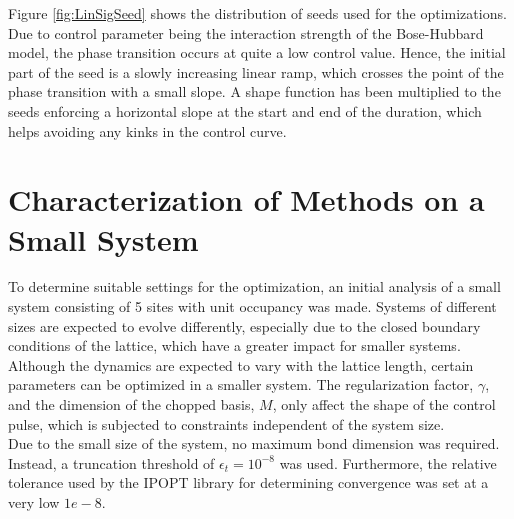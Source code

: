Figure \ref{fig:LinSigSeed} shows the distribution of seeds used for the optimizations. Due to control parameter being the interaction strength of the Bose-Hubbard model, the phase transition occurs at quite a low control value. Hence, the initial part of the seed is a slowly increasing linear ramp, which crosses the point of the phase transition with a small slope. A shape function has been multiplied to the seeds enforcing a horizontal slope at the start and end of the duration, which helps avoiding any kinks in the control curve.



\section{Characterization of Methods on a Small System} \label{sec:5partOptimization}
To determine suitable settings for the optimization, an initial analysis of a small system consisting of 5 sites with unit occupancy was made. Systems of different sizes are expected to evolve differently, especially due to the closed boundary conditions of the lattice, which have a greater impact for smaller systems. Although the dynamics are expected to vary with the lattice length, certain parameters can be optimized in a smaller system. The regularization factor, $\gamma$, and the dimension of the chopped basis, $M$, only affect the shape of the control pulse, which is subjected to constraints independent of the system size.\\
Due to the small size of the system, no maximum bond dimension was required. Instead, a truncation threshold of $\epsilon_t = 10^{-8}$ was used. Furthermore, the relative tolerance used by the IPOPT library for determining convergence was set at a very low $1e-8$. 

